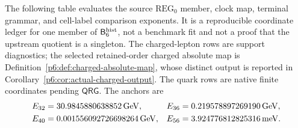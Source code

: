 \documentclass[11pt,a4paper]{article}
\newcommand{\BridgeRaw}{\mathsf B_6^{\rm hist}}
\begin{document}
\begin{definition}
\label{p6:def:numerical-ledger-purpose}
The following table evaluates the source \(\mathrm{REG}_0\) member, clock map,
terminal grammar, and cell-label comparison exponents.  It is a reproducible coordinate
ledger for one member of \(\BridgeRaw\), not a benchmark fit and not a proof
that the upstream quotient is a singleton.  The charged-lepton rows are
support diagnostics; the selected retained-order charged absolute map is
Definition~\ref{p6:def:charged-absolute-map}, whose distinct output is
reported in Corollary~\ref{p6:cor:actual-charged-output}.  The quark rows are
native finite coordinates pending \(\mathsf{QRG}\).
The anchors are
\[
\begin{aligned}
E_{32}&=30.9845880638852\,{\rm GeV},&
E_{36}&=0.219578897269190\,{\rm GeV},\\
E_{40}&=0.001556092726698264\,{\rm GeV},&
E_{56}&=3.924776812825316\,{\rm meV}.
\end{aligned}
\]
\end{definition}
\end{document}
